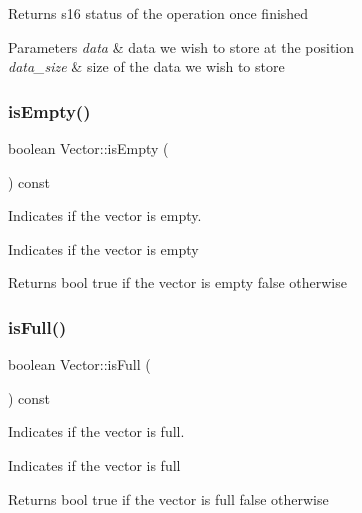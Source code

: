 \begin{DoxyReturn}{Returns}
s16 status of the operation once finished 
\end{DoxyReturn}

\begin{DoxyParams}{Parameters}
{\em data} & data we wish to store at the position \\
\hline
{\em data\+\_\+size} & size of the data we wish to store \\
\hline
\end{DoxyParams}
\mbox{\label{class_vector_a390f85b3efa89070994f43b6570c909e}} 
\subsubsection{\texorpdfstring{is\+Empty()}{isEmpty()}}
{\footnotesize\ttfamily boolean Vector\+::is\+Empty (\begin{DoxyParamCaption}{ }\end{DoxyParamCaption}) const}



Indicates if the vector is empty. 

Indicates if the vector is empty

\begin{DoxyReturn}{Returns}
bool true if the vector is empty false otherwise 
\end{DoxyReturn}
\mbox{\label{class_vector_ab9bedff9bd3c3826d7f2fa9a78116c9d}} 
\subsubsection{\texorpdfstring{is\+Full()}{isFull()}}
{\footnotesize\ttfamily boolean Vector\+::is\+Full (\begin{DoxyParamCaption}{ }\end{DoxyParamCaption}) const}



Indicates if the vector is full. 

Indicates if the vector is full

\begin{DoxyReturn}{Returns}
bool true if the vector is full false otherwise 
\end{DoxyReturn}
\mbox{\label{class_vector_a753c7105d2a6acf776b190d29cecd356}} 
